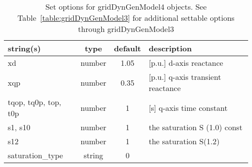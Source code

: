 \begin{table}[ht]
\centering
\begin{tabular}{p{5cm} c c p{7cm}}
\hline
string(s) & type & default & description \\
\hline
xd & number & 1.05 & [p.u.] d-axis reactance\\
xqp & number & 0.35 & [p.u.] q-axis transient reactance\\
tqop, tq0p, top, t0p & number & 1 & [s]    q-axis time constant\\
s1, s10 & number & 1 & the saturation S (1.0) const\\
s12 & number & 1 & the saturation S(1.2)\\
saturation\_type & string & 0 & \\
\hline
\end{tabular}
\caption{Set options for gridDynGenModel4 objects. See Table~\ref{table:gridDynGenModel3} for additional settable options through gridDynGenModel3}
\label{table:gridDynGenModel4}
\end{table}

